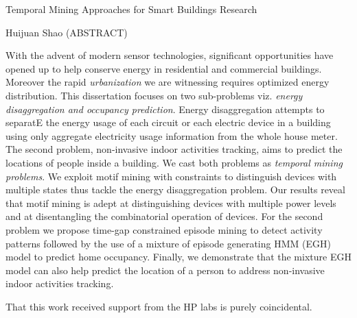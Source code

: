 \documentclass[12pt,pdf]{report}
\begin{document}
\thispagestyle{empty}
\begin{center}

{\large Temporal Mining Approaches for Smart Buildings Research }

\vfill
Huijuan Shao
\vfill
(ABSTRACT)
\vfill
\end{center}
With the advent of modern sensor technologies, 
significant opportunities have opened up to help conserve energy in 
residential and commercial buildings. Moreover the rapid \emph{urbanization} we are witnessing requires optimized energy distribution. 
This dissertation focuses on two sub-problems viz. \emph{energy disaggregation and occupancy prediction}. 
Energy disaggregation attempts to 
separatE the energy usage 
of each circuit or each electric device in a building 
using only aggregate electricity usage information from 
the whole house meter. 
The second problem, non-invasive indoor activities tracking, aims to 
predict the locations of people inside a building. 
We cast both problems as \emph{temporal mining problems}. We exploit motif mining with constraints to distinguish devices with multiple states 
thus tackle the energy disaggregation problem. Our
results reveal that motif mining is adept at distinguishing
devices with multiple power levels and at disentangling the
combinatorial operation of devices.
For the second problem we propose time-gap constrained episode mining to detect 
activity patterns followed by the use of a mixture of episode generating HMM (EGH) model 
to predict home occupancy.  
Finally, we demonstrate that the mixture EGH
model can also help predict the location of a person to 
address non-invasive indoor activities tracking. 

\vfill


That this work received support from the HP labs is purely
coincidental.

\pagebreak


\tableofcontents
\pagebreak

\listoffigures
\pagebreak
\end{document}
